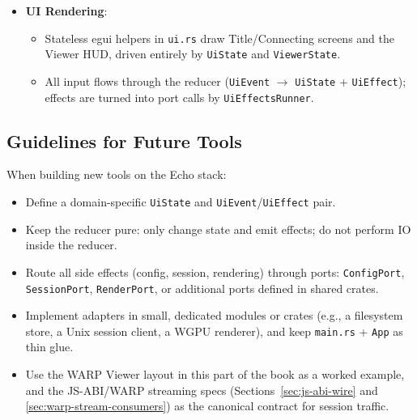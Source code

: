 \begin{itemize}
\begin{itemize}
      \item Implemented by a small \texttt{WinitRenderPort} wrapper around
            \texttt{winit::window::Window::request\_redraw}.
      \item The viewer calls \texttt{RenderPort::request\_redraw} after each
            frame, leaving windowing details outside the core.
    \end{itemize}
  \item \textbf{UI Rendering}:
    \begin{itemize}
      \item Stateless egui helpers in \texttt{ui.rs} draw Title/Connecting
            screens and the Viewer HUD, driven entirely by \texttt{UiState} and
            \texttt{ViewerState}.
      \item All input flows through the reducer
            (\texttt{UiEvent} $\rightarrow$ \texttt{UiState} + \texttt{UiEffect}); effects are turned into port calls by \texttt{UiEffectsRunner}.
    \end{itemize}
\end{itemize}

\subsection{Guidelines for Future Tools}

When building new tools on the Echo stack:

\begin{itemize}
  \item Define a domain-specific \texttt{UiState} and
        \texttt{UiEvent}/\texttt{UiEffect} pair.
  \item Keep the reducer pure: only change state and emit effects; do not
        perform IO inside the reducer.
  \item Route all side effects (config, session, rendering) through ports:
        \texttt{ConfigPort}, \texttt{SessionPort}, \texttt{RenderPort}, or
        additional ports defined in shared crates.
  \item Implement adapters in small, dedicated modules or crates (e.g., a
        filesystem store, a Unix session client, a WGPU renderer), and keep
        \texttt{main.rs} + \texttt{App} as thin glue.
  \item Use the WARP Viewer layout in this part of the book as a worked example,
        and the JS-ABI/WARP streaming specs
        (Sections~\ref{sec:js-abi-wire} and \ref{sec:warp-stream-consumers})
        as the canonical contract for session traffic.
\end{itemize}

